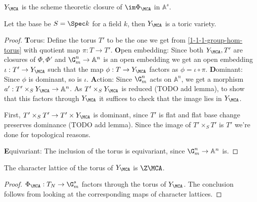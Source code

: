 \begin{definition}
  \label{1-1-7-ya}

  $Y_\MCA$ is the scheme theoretic closure of $\im \Phi_\MCA$ in $\mathbb A^s$.
\end{definition}


\begin{proposition}
  \label{1-1-8-aff-tor-var-ya}

  Let the base be $S=\Spec k$ for a field $k$, then $Y_\MCA$ is a toric variety.
\end{proposition}
\begin{proof}

  {\textbf Torus: }
  Define the torus $T'$ to be the one we get from \ref{1-1-1-group-hom-torus} with quotient map $\pi:T \to T'$.
  {\textbf Open embedding: }
  Since both $Y_{\MCA},T'$ are closures of $\Phi,\Phi'$ and $\G_m^n\to\mathbb{A}^n$ is an open embedding
  we get an open embedding $\iota:T' \to Y_{\MCA}$ such that the map $\phi:T \to Y_{\MCA}$ factors as
  $\phi = \iota \circ \pi$.
  {\textbf Dominant: } Since $\phi$ is dominant, so is $\iota$.
  {\textbf Action: }
  Since $\G_m^n$ acts on $\mathbb{A}^n$, we get a morphism $a':T' \times_S Y_\MCA \to \mathbb{A}^n$.
  As $T'\times_S Y_\MCA$ is reduced (TODO add lemma), to show that this factors through $Y_\MCA$ it suffices to check
  that the image lies in $Y_\MCA$.

  First, $T'\times_S T' \to T'\times Y_\MCA$ is dominant, since $T'$ is flat and flat base change preserves dominance (TODO add lemma).
  Since the image of $T'\times_S T'$ is $T'$ we're done for topological reasons.

  {\textbf Equivariant: } The inclusion of the torus is equivariant, since $\G_m^n \to \mathbb{A}^n$ is.
\end{proof}


\begin{proposition}
  \label{1-1-8-char-ya}

  The character lattice of the torus of $Y_\MCA$ is $\Z \MCA$.
\end{proposition}
\begin{proof}

  $\Phi_\MCA: T_N \to \G_m^s$ factors through the torus of $Y_\MCA$.
  The conclusion follows from looking at the corresponding maps of character lattices.
\end{proof}


